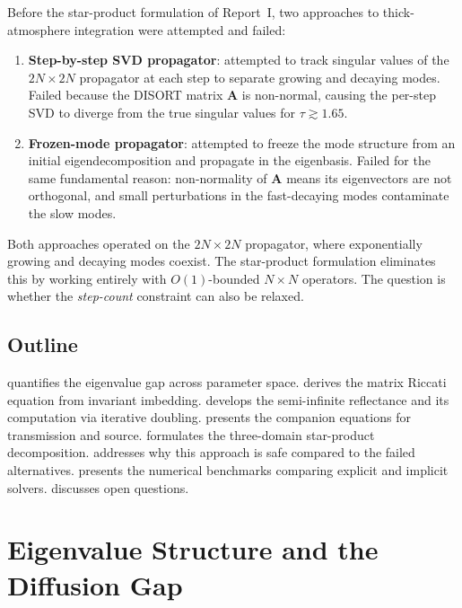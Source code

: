 \documentclass[11pt,a4paper]{article}
\newcommand{\mat}[1]{\mathbf{#1}}
\theoremstyle{definition}
\begin{document}
Before the star-product formulation of Report~I, two approaches to
thick-atmosphere integration were attempted and failed:
\begin{enumerate}[nosep]
\item \textbf{Step-by-step SVD propagator}: attempted to track
  singular values of the $2N\!\times\!2N$ propagator at each step to
  separate growing and decaying modes.  Failed because the DISORT
  matrix $\mat{A}$ is non-normal, causing the per-step SVD to diverge
  from the true singular values for $\tau\gtrsim 1.65$.
\item \textbf{Frozen-mode propagator}: attempted to freeze the mode
  structure from an initial eigendecomposition and propagate in the
  eigenbasis.  Failed for the same fundamental reason: non-normality
  of $\mat{A}$ means its eigenvectors are not orthogonal, and
  small perturbations in the fast-decaying modes contaminate the
  slow modes.
\end{enumerate}
Both approaches operated on the $2N\!\times\!2N$ propagator, where
exponentially growing and decaying modes coexist.  The star-product
formulation eliminates this by working entirely with $O(1)$-bounded
$N\!\times\!N$ operators.  The question is whether the
\emph{step-count} constraint can also be relaxed.

\subsection{Outline}

 quantifies the eigenvalue gap across
parameter space.   derives the matrix Riccati
equation from invariant imbedding.   develops the
semi-infinite reflectance and its computation via iterative doubling.
 presents the companion equations for
transmission and source.   formulates the
three-domain star-product decomposition.   addresses
why this approach is safe compared to the failed alternatives.
 presents the numerical benchmarks comparing
explicit and implicit solvers.   discusses open
questions.


\section{Eigenvalue Structure and the Diffusion Gap}
\label{sec:eigenvalue_gap}
\end{document}
